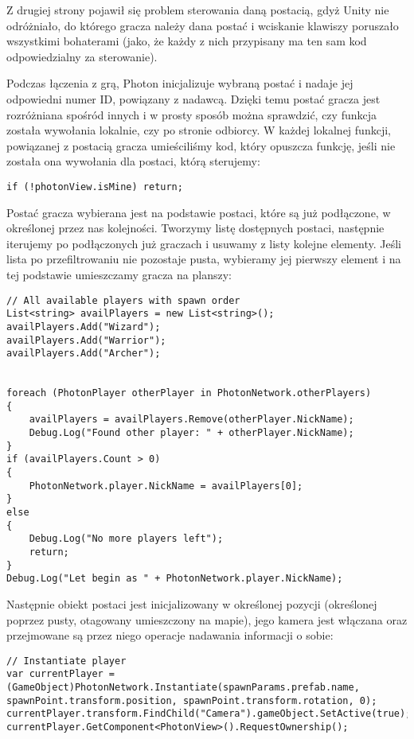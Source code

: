 Z drugiej strony pojawił się problem sterowania daną postacią, gdyż Unity nie odróżniało, do którego gracza należy dana postać i wciskanie klawiszy poruszało wszystkimi bohaterami (jako, że każdy z nich przypisany ma ten sam kod odpowiedzialny za sterowanie).

Podczas łączenia z grą, Photon inicjalizuje wybraną postać i nadaje jej odpowiedni numer ID, powiązany z nadawcą. Dzięki temu postać gracza jest rozróżniana spośród innych i w prosty sposób można sprawdzić, czy funkcja została wywołania lokalnie, czy po stronie odbiorcy. W każdej lokalnej funkcji, powiązanej z postacią gracza umieściliśmy kod, który opuszcza funkcję, jeśli nie została ona wywołania dla postaci, którą sterujemy:
\\
\begin{lstlisting}[caption={Opuszczanie funkcji w przypadku, gdy postać gracza nie należy do nas}]
if (!photonView.isMine) return;
\end{lstlisting}

Postać gracza wybierana jest na podstawie postaci, które są już podłączone, w określonej przez nas kolejności. Tworzymy listę dostępnych postaci, następnie iterujemy po podłączonych już graczach i usuwamy z listy kolejne elementy. Jeśli lista po przefiltrowaniu nie pozostaje pusta, wybieramy jej pierwszy element i na tej podstawie umieszczamy gracza na planszy:
\\
\begin{lstlisting}[caption={Algorytm wybierania postaci gracza}]
// All available players with spawn order
List<string> availPlayers = new List<string>();
availPlayers.Add("Wizard"); 
availPlayers.Add("Warrior");
availPlayers.Add("Archer");


foreach (PhotonPlayer otherPlayer in PhotonNetwork.otherPlayers)
{
    availPlayers = availPlayers.Remove(otherPlayer.NickName);
    Debug.Log("Found other player: " + otherPlayer.NickName);
}
if (availPlayers.Count > 0)
{
    PhotonNetwork.player.NickName = availPlayers[0];
}
else
{
    Debug.Log("No more players left");
    return;
}
Debug.Log("Let begin as " + PhotonNetwork.player.NickName);
\end{lstlisting}

Następnie obiekt postaci jest inicjalizowany w określonej pozycji (określonej poprzez pusty, otagowany  umieszczony na mapie), jego kamera jest włączana oraz przejmowane są przez niego operacje nadawania informacji o sobie:
\\
\begin{lstlisting}[caption={Algorytm inicjalizacji postaci gracza}]
// Instantiate player
var currentPlayer = (GameObject)PhotonNetwork.Instantiate(spawnParams.prefab.name, spawnPoint.transform.position, spawnPoint.transform.rotation, 0);
currentPlayer.transform.FindChild("Camera").gameObject.SetActive(true);
currentPlayer.GetComponent<PhotonView>().RequestOwnership();
\end{lstlisting}